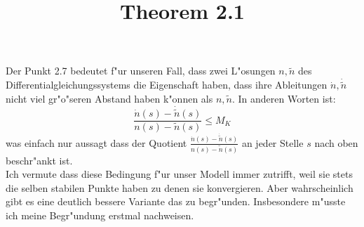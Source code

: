 \documentclass[11pt,a4paper]{article}
\title{Theorem 2.1}
\begin{document}
\maketitle

Der Punkt 2.7 bedeutet f"ur unseren Fall, dass zwei L"osungen $ n, \tilde{n} $ des Differentialgleichungssystems die Eigenschaft haben, dass ihre Ableitungen 
$ \dot{n}, \dot{\tilde{n}} $ nicht viel gr"o"seren Abstand haben k"onnen als $ n, \tilde{n} $. In anderen Worten ist:
\[ \frac{\dot{n}(s) - \dot{\tilde{n}}(s)}{n(s) - \tilde{n}(s)} \le M_K\]
was einfach nur aussagt dass der Quotient $ \frac{\dot{n}(s) - \dot{\tilde{n}}(s)}{n(s) - \tilde{n}(s)} $ an jeder Stelle $ s $ nach oben beschr"ankt ist. \\
Ich vermute dass diese Bedingung f"ur unser Modell immer zutrifft, weil sie stets die selben stabilen Punkte haben zu denen sie konvergieren. Aber wahrscheinlich gibt es eine deutlich bessere Variante das zu begr"unden. Insbesondere m"usste ich meine Begr"undung erstmal nachweisen.
\end{document}
